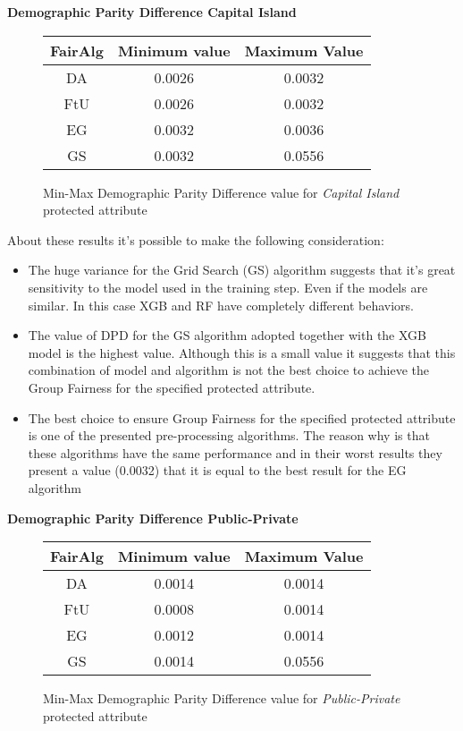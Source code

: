 \newpage
\textbf{Demographic Parity Difference Capital Island}
\begin{figure}[H]
    \centering
    \begin{tabular}{|c|c|c|}
        \hline
        \textbf{FairAlg} & \textbf{Minimum value} & \textbf{Maximum Value} \\
        \hline
        DA & 0.0026 & 0.0032 \\
        \hline
        FtU & 0.0026 & 0.0032 \\
        \hline
        EG & 0.0032 & 0.0036 \\
        \hline
        GS & 0.0032 & 0.0556 \\
        \hline
    \end{tabular}
    \caption{Min-Max Demographic Parity Difference value for \emph{Capital Island} protected attribute}
\end{figure}

About these results it's possible to make the following consideration:

\begin{itemize}
    \item The huge variance for the Grid Search (GS) algorithm suggests that it's great sensitivity to the model used in the training step. Even if the models are similar. In this case XGB and RF have completely different behaviors.

    \item The value of DPD for the GS algorithm adopted together with the XGB model is the highest value. Although this is a small value it suggests that this combination of model and algorithm is not the best choice to achieve the Group Fairness for the specified protected attribute.

    \item The best choice to ensure Group Fairness for the specified protected attribute is one of the presented pre-processing algorithms. The reason why is that these algorithms have the same performance and in their worst results they present a value (0.0032) that it is equal to the best result for the EG algorithm
\end{itemize}

\newpage
\textbf{Demographic Parity Difference Public-Private}
\begin{figure}[H]
    \centering
    \begin{tabular}{|c|c|c|}
        \hline
        \textbf{FairAlg} & \textbf{Minimum value} & \textbf{Maximum Value} \\
        \hline
        DA & 0.0014 & 0.0014 \\
        \hline
        FtU & 0.0008 & 0.0014 \\
        \hline
        EG & 0.0012 & 0.0014 \\
        \hline
        GS & 0.0014 & 0.0556 \\
        \hline
    \end{tabular}
    \caption{Min-Max Demographic Parity Difference value for \emph{Public-Private} protected attribute}
\end{figure}

